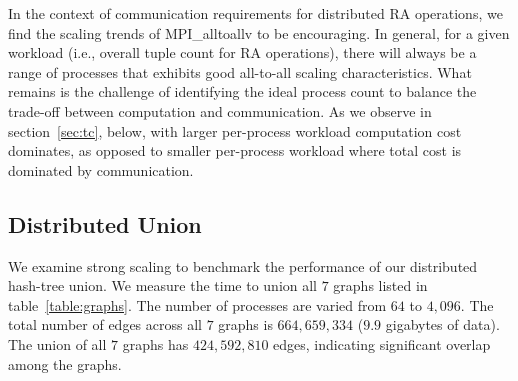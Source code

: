In the context of communication requirements for distributed RA operations, we find the scaling trends of MPI\_alltoallv to be encouraging. In general, for a given workload (i.e., overall tuple count for RA operations), there will always be a range of processes that exhibits good all-to-all scaling characteristics. What remains is the challenge of identifying the ideal process count to balance the trade-off between computation and communication. As we observe in section~\ref{sec:tc}, below, with larger per-process workload computation cost dominates, as opposed to smaller per-process workload where total cost is dominated by communication. 



\subsection{Distributed Union}
\label{sec:union}


We examine strong scaling to benchmark the performance of our distributed hash-tree union. We measure the time to union all $7$ graphs listed in table~\ref{table:graphs}. The number of processes are varied from $64$ to $4,\!096$. The total number of edges across all $7$ graphs is $664,\!659,\!334$ ($9.9$ gigabytes of data). The union of all $7$ graphs has $424,\!592,\!810$ edges, indicating significant overlap among the graphs.

